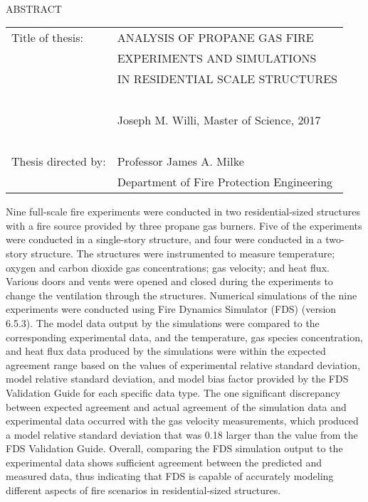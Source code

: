 
\hbox{\ }

\renewcommand{\baselinestretch}{1}
\small \normalsize

\begin{center}
\large{{ABSTRACT}} 

\vspace{3em} 

\end{center}
\hspace{-.15in}
\begin{tabular}{ll}
Title of thesis:		& {\large  ANALYSIS OF PROPANE GAS FIRE}	\\
							& {\large  EXPERIMENTS AND SIMULATIONS} 	\\
							& {\large  IN RESIDENTIAL SCALE STRUCTURES} \\
\ \\
							& {\large  Joseph M. Willi, Master of Science, 2017} \\
\ \\
Thesis directed by: 	& {\large  Professor James A. Milke} \\
							& {\large  Department of Fire Protection Engineering} \\
\end{tabular}

\vspace{3em}

\renewcommand{\baselinestretch}{2}
\large \normalsize

Nine full-scale fire experiments were conducted in two residential-sized structures with a fire source provided by three propane gas burners. Five of the experiments were conducted in a single-story structure, and four were conducted in a two-story structure. The structures were instrumented to measure temperature; oxygen and carbon dioxide gas concentrations; gas velocity; and heat flux. Various doors and vents were opened and closed during the experiments to change the ventilation through the structures. Numerical simulations of the nine experiments were conducted using Fire Dynamics Simulator (FDS) (version 6.5.3). The model data output by the simulations were compared to the corresponding experimental data, and the temperature, gas species concentration, and heat flux data produced by the simulations were within the expected agreement range based on the values of experimental relative standard deviation, model relative standard deviation, and model bias factor provided by the FDS Validation Guide for each specific data type. The one significant discrepancy between expected agreement and actual agreement of the simulation data and experimental data occurred with the gas velocity measurements, which produced a model relative standard deviation that was 0.18 larger than the value from the FDS Validation Guide. Overall, comparing the FDS simulation output to the experimental data shows sufficient agreement between the predicted and measured data, thus indicating that FDS is capable of accurately modeling different aspects of fire scenarios in residential-sized structures.


